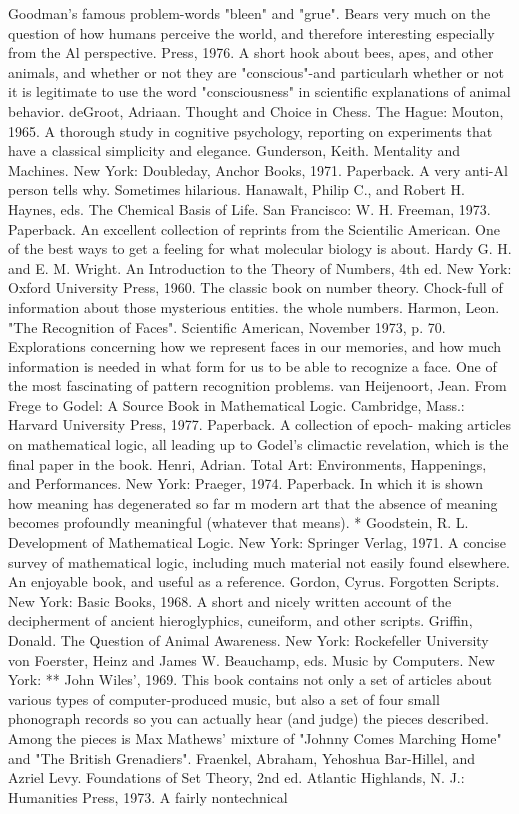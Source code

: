   Goodman's famous problem-words "bleen" and "grue". Bears very much on the
  question of how humans perceive the world, and therefore interesting especially from
  the Al perspective.
Press, 1976. A short hook about bees, apes, and other animals, and whether or not they
  are "conscious"-and particularh whether or not it is legitimate to use the word
  "consciousness" in scientific explanations of animal behavior.
deGroot, Adriaan. Thought and Choice in Chess. The Hague: Mouton, 1965. A thorough
  study in cognitive psychology, reporting on experiments that have a classical simplicity
  and elegance.
Gunderson, Keith. Mentality and Machines. New York: Doubleday, Anchor Books, 1971.
  Paperback. A very anti-Al person tells why. Sometimes hilarious.
Hanawalt, Philip C., and Robert H. Haynes, eds. The Chemical Basis of Life. San
  Francisco: W. H. Freeman, 1973. Paperback. An excellent collection of reprints from
  the Scientilic American. One of the best ways to get a feeling for what molecular
  biology is about.
Hardy G. H. and E. M. Wright. An Introduction to the Theory of Numbers, 4th ed. New
  York: Oxford University Press, 1960. The classic book on number theory. Chock-full
  of information about those mysterious entities. the whole numbers.
Harmon, Leon. "The Recognition of Faces". Scientific American, November 1973, p. 70.
  Explorations concerning how we represent faces in our memories, and how much
  information is needed in what form for us to be able to recognize a face. One of the
  most fascinating of pattern recognition problems.
van Heijenoort, Jean. From Frege to Godel: A Source Book in Mathematical Logic.
  Cambridge, Mass.: Harvard University Press, 1977. Paperback. A collection of epoch-
  making articles on mathematical logic, all leading up to Godel's climactic revelation,
  which is the final paper in the book.
Henri, Adrian. Total Art: Environments, Happenings, and Performances. New York:
  Praeger, 1974. Paperback. In which it is shown how meaning has degenerated so far m
  modern art that the absence of meaning becomes profoundly meaningful (whatever that
  means).
  * Goodstein, R. L. Development of Mathematical Logic. New York: Springer Verlag,
  1971. A concise survey of mathematical logic, including much material not easily
  found elsewhere. An enjoyable book, and useful as a reference.
Gordon, Cyrus. Forgotten Scripts. New York: Basic Books, 1968. A short and nicely
  written account of the decipherment of ancient hieroglyphics, cuneiform, and other
  scripts.
Griffin, Donald. The Question of Animal Awareness. New York: Rockefeller University
von Foerster, Heinz and James W. Beauchamp, eds. Music by Computers. New York:
        **
John Wiles', 1969. This book contains not only a set of articles about various types of
  computer-produced music, but also a set of four small phonograph records so you can
  actually hear (and judge) the pieces described. Among the pieces is Max Mathews'
  mixture of "Johnny Comes Marching Home" and "The British Grenadiers".
Fraenkel, Abraham, Yehoshua Bar-Hillel, and Azriel Levy. Foundations of Set Theory,
  2nd ed. Atlantic Highlands, N. J.: Humanities Press, 1973. A fairly nontechnical



